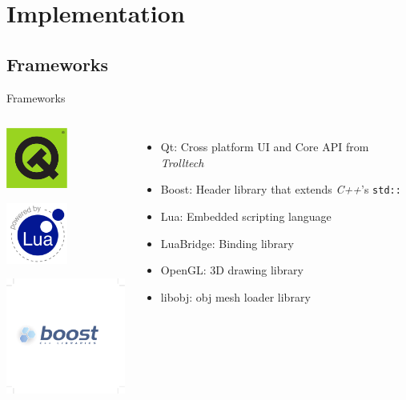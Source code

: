 \documentclass[12pt,ucs,hyperref={pdftext}]{beamer}
\newlength{\columnleft}
\newlength{\columnright}
\begin{document}
\section{Implementation}


\subsection{Frameworks}

\begin{frame}{Frameworks}
\begin{columns}

\column{\columnleft}

\begin{center}
\includegraphics[width=2cm]{media/logo/qt_original_r.pdf}

\bigskip

\includegraphics[width=2cm]{media/logo/lua-logo-label.pdf}

\bigskip

\includegraphics[width=4cm]{media/logo/boost-vec-white.pdf}
\end{center}

\column{\columnright}
\begin{itemize}%
\item Qt: Cross platform UI and Core API from \textit{Trolltech}
\item Boost: Header library that extends \textit{C++}'s \lstinline{std::}
\item Lua: Embedded scripting language
\item LuaBridge: Binding library
\item OpenGL: 3D drawing library
\item libobj: obj mesh loader library
\end{itemize}

\end{columns}
\end{frame}
\end{document}
